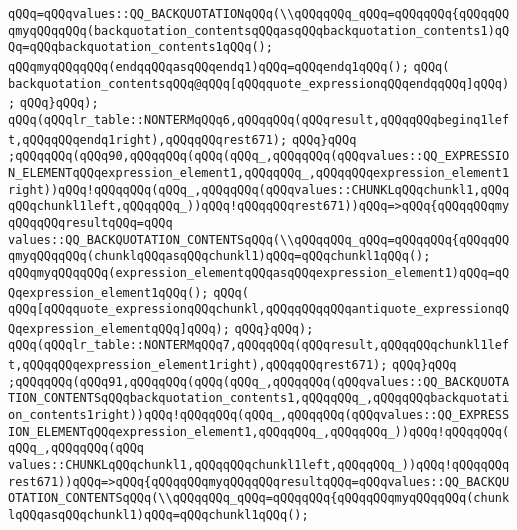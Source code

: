 \verb|qQQq=qQQqvalues::QQ_BACKQUOTATIONqQQq(\\qQQqqQQq_qQQq=qQQqqQQq{qQQqqQQqmyqQQqqQQq(backquotation_contentsqQQqasqQQqbackquotation_contents1)qQQq=qQQqbackquotation_contents1qQQq();|\newline
\verb|qQQqmyqQQqqQQq(endqqQQqasqQQqendq1)qQQq=qQQqendq1qQQq();|\newline
\verb|qQQq(|\newline
\verb|backquotation_contentsqQQq@qQQq[qQQqquote_expressionqQQqendqqQQq]qQQq);|\newline
\verb|qQQq}qQQq);|\newline
\verb|qQQq(qQQqlr_table::NONTERMqQQq6,qQQqqQQq(qQQqresult,qQQqqQQqbeginq1left,qQQqqQQqendq1right),qQQqqQQqrest671);|\newline
\verb|qQQq}qQQq|\newline
\verb|;qQQqqQQq(qQQq90,qQQqqQQq(qQQq(qQQq_,qQQqqQQq(qQQqvalues::QQ_EXPRESSION_ELEMENTqQQqexpression_element1,qQQqqQQq_,qQQqqQQqexpression_element1right))qQQq!qQQqqQQq(qQQq_,qQQqqQQq(qQQqvalues::CHUNKLqQQqchunkl1,qQQqqQQqchunkl1left,qQQqqQQq_))qQQq!qQQqqQQqrest671))qQQq=>qQQq{qQQqqQQqmyqQQqqQQqresultqQQq=qQQq|\newline
\verb|values::QQ_BACKQUOTATION_CONTENTSqQQq(\\qQQqqQQq_qQQq=qQQqqQQq{qQQqqQQqmyqQQqqQQq(chunklqQQqasqQQqchunkl1)qQQq=qQQqchunkl1qQQq();|\newline
\verb|qQQqmyqQQqqQQq(expression_elementqQQqasqQQqexpression_element1)qQQq=qQQqexpression_element1qQQq();|\newline
\verb|qQQq(|\newline
\verb|qQQq[qQQqquote_expressionqQQqchunkl,qQQqqQQqqQQqantiquote_expressionqQQqexpression_elementqQQq]qQQq);|\newline
\verb|qQQq}qQQq);|\newline
\verb|qQQq(qQQqlr_table::NONTERMqQQq7,qQQqqQQq(qQQqresult,qQQqqQQqchunkl1left,qQQqqQQqexpression_element1right),qQQqqQQqrest671);|\newline
\verb|qQQq}qQQq|\newline
\verb|;qQQqqQQq(qQQq91,qQQqqQQq(qQQq(qQQq_,qQQqqQQq(qQQqvalues::QQ_BACKQUOTATION_CONTENTSqQQqbackquotation_contents1,qQQqqQQq_,qQQqqQQqbackquotation_contents1right))qQQq!qQQqqQQq(qQQq_,qQQqqQQq(qQQqvalues::QQ_EXPRESSION_ELEMENTqQQqexpression_element1,qQQqqQQq_,qQQqqQQq_))qQQq!qQQqqQQq(qQQq_,qQQqqQQq(qQQq|\newline
\verb|values::CHUNKLqQQqchunkl1,qQQqqQQqchunkl1left,qQQqqQQq_))qQQq!qQQqqQQqrest671))qQQq=>qQQq{qQQqqQQqmyqQQqqQQqresultqQQq=qQQqvalues::QQ_BACKQUOTATION_CONTENTSqQQq(\\qQQqqQQq_qQQq=qQQqqQQq{qQQqqQQqmyqQQqqQQq(chunklqQQqasqQQqchunkl1)qQQq=qQQqchunkl1qQQq();|\newline
